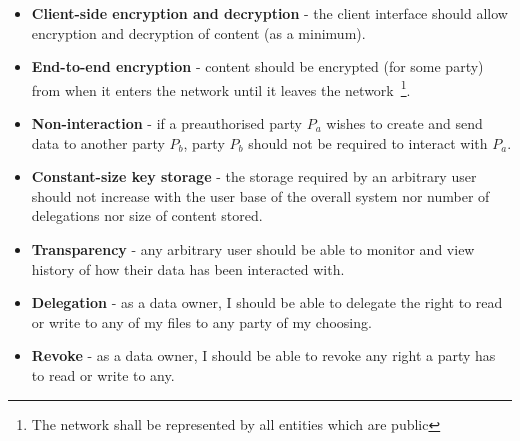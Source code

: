 \begin{itemize}
\item \textbf{Client-side encryption and decryption} - the client interface should allow encryption and decryption of content (as a minimum).
\item \textbf{End-to-end encryption} - content should be encrypted (for some party) from when it enters the network until it leaves the network~\footnote{The network shall be represented by all entities which are public}.
\item \textbf{Non-interaction} - if a preauthorised party $P_a$ wishes to create and send data to another party $P_b$, party $P_b$ should not be required to interact with $P_a$.
\item \textbf{Constant-size key storage} - the storage required by an arbitrary user should not increase with the user base of the overall system nor number of delegations nor size of content stored.
\item \textbf{Transparency} - any arbitrary user should be able to monitor and view history of how their data has been interacted with.
\item \textbf{Delegation} - as a data owner, I should be able to delegate the right to read or write to any of my files to any party of my choosing.
\item \textbf{Revoke} - as a data owner, I should be able to revoke any right a party has to read or write to any.
\end{itemize}

